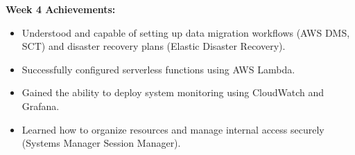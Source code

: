 \vspace{0.5em}\noindent\textbf{Week 4 Achievements:}\par

\begin{itemize}
\tightlist
\item
  Understood and capable of setting up data migration workflows (AWS
  DMS, SCT) and disaster recovery plans (Elastic Disaster Recovery).
\item
  Successfully configured serverless functions using AWS Lambda.
\item
  Gained the ability to deploy system monitoring using CloudWatch and
  Grafana.
\item
  Learned how to organize resources and manage internal access securely
  (Systems Manager Session Manager).
\end{itemize}
